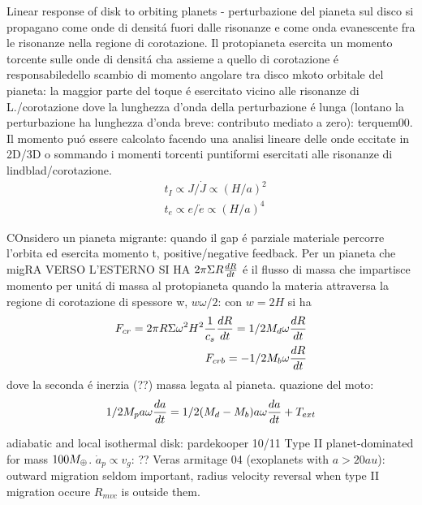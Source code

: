 \begin{workout}
\begin{workout}
Linear response of disk to orbiting planets - perturbazione del pianeta sul disco si propagano come onde di densit\'a fuori dalle risonanze e come onda evanescente fra le risonanze nella regione di corotazione. Il protopianeta esercita un momento torcente sulle onde di densit\'a cha assieme  a quello di corotazione \'e responsabiledello scambio di momento angolare tra disco mkoto orbitale del pianeta: la maggior parte del toque \'e esercitato vicino alle risonanze di L./corotazione dove la lunghezza d'onda della perturbazione \'e lunga (lontano la perturbazione ha lunghezza d'onda breve: contributo mediato a zero): terquem00.
Il momento pu\'o essere calcolato facendo una analisi lineare delle onde eccitate in 2D/3D o sommando i momenti torcenti puntiformi esercitati alle risonanze di lindblad/corotazione.
\begin{align}
&t_I\propto J/\dot{J}\propto(H/a)^2\\
&t_e\propto e/\dot{e}\propto(H/a)^4
\end{align}
\end{workout}

\begin{workout}
COnsidero un pianeta migrante: quando il gap \'e parziale materiale percorre l'orbita ed esercita momento t, positive/negative feedback.
Per un pianeta che migRA VERSO L'ESTERNO SI HA
$2\pi\Sigma R\TDy{t}{R}$ \'e il flusso di massa che impartisce momento per unit\'a di massa al protopianeta quando la materia attraversa la regione di corotazione di spessore w, $w\omega/2$: con $w=2H$ si ha
\begin{align}
F_{cr}=2\pi R\Sigma\omega^2 H^2\frac{1}{c_s}\TDy{t}{R}=1/2M_d\omega\TDy{t}{R}\\
F_{crb}=-1/2M_b\omega\TDy{t}{R}
\end{align}
dove la seconda \'e inerzia (??) massa legata al pianeta.
quazione del moto:
\begin{equation}
1/2M_pa\omega\TDy{t}{a}=1/2(M_d-M_b)a\omega\TDy{t}{a}+T_{ext}
\end{equation}
\end{workout}

\begin{workout}
adiabatic and local isothermal disk: pardekooper 10/11
Type II planet-dominated for mass $100\mearth{}$.
$\dot{a}_p\propto v_g$: ??
Veras armitage 04 (exoplanets with $a>20au$): outward migration seldom important, radius velocity reversal when type II migration occure $R_{mvc}$ is outside them.
\end{workout}



\end{workout}
